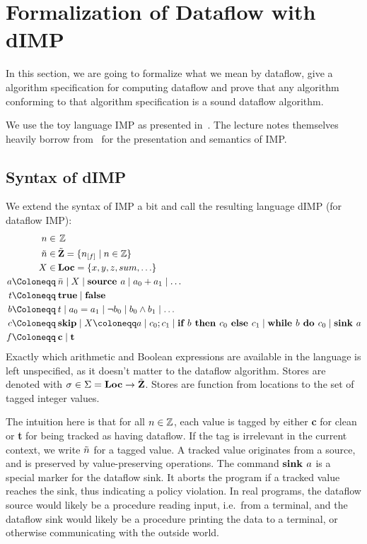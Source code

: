 \section{Formalization of Dataflow with dIMP}

In this section, we are going to formalize what we mean by dataflow,
give a algorithm specification for computing dataflow and prove that any algorithm conforming
to that algorithm specification is a sound dataflow algorithm.

We use the toy language IMP as presented in~\cite{sat}.
The lecture notes themselves heavily borrow from~\cite{fsopl} for the
presentation and semantics of IMP.

\subsection{Syntax of dIMP}
We extend the syntax of IMP a bit
and call the resulting language dIMP (for dataflow IMP):
\begin{align*}
    n \in  \:       & \Z\\
    \flaggedn{} \in \: & \StoreDomain = \{\flagged{} \mid n \in \Z\}\\
    X \in  \:       & \Loc = \{x, y, z, sum, \ldots\}\\
    a \Coloneqq \: &\literalint{} \mid X \mid \defaultsource \mid a_0+a_1 \mid \ldots\\
    t \Coloneqq \: & \btrue \mid \bfalse                                                \\
    b \Coloneqq \: & t \mid a_0 = a_1 \mid \neg b_0 \mid b_0 \land b_1 \mid \ldots \\
    c \Coloneqq \: &\skipcmd \mid \defaultstore \mid \defaultseq \mid \defaultif \mid \defaultwhile \mid \defaultsink\\
    f \Coloneqq \: & \textbf{c} \mid \textbf{t}\\
\end{align*}
Exactly which arithmetic and Boolean expressions are available in the language
is left unspecified, as it doesn't matter to the dataflow algorithm.
Stores are denoted with $\sigma \in \Sigma = \textbf{Loc} \to \tilde{\textbf{Z}}$.
Stores are function from locations to the set of tagged integer
values.

The intuition here is that for all $n \in \operatorname{\mathbb{Z}}$, 
each value is tagged by either \textbf{c} for clean or \textbf{t} for being tracked
as having dataflow.
If the tag is irrelevant in the current context, we write $\flaggedn{}$ for a tagged
value.
A tracked value originates from a source, and is preserved by value-preserving operations.
The command $\textbf{sink }{a}$ is a special marker for the dataflow sink.
It aborts the program if a tracked value reaches the sink, thus indicating a policy 
violation.
In real programs, the dataflow source would likely be a procedure reading input,
i.e.\ from a terminal, and the dataflow sink would likely be a procedure 
printing the data to a terminal, or otherwise communicating with the outside world.


